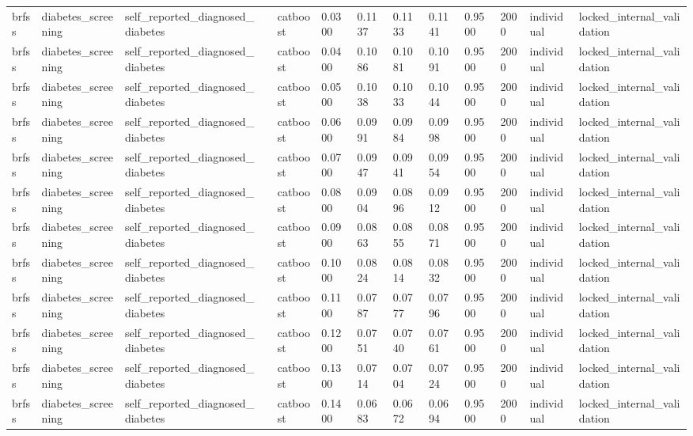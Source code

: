 \begin{tabular}{lllllllllllll}
brfss & diabetes\_screening & self\_reported\_diagnosed\_diabetes &  & catboost & 0.0300 & 0.1137 & 0.1133 & 0.1141 & 0.9500 & 2000 & individual & locked\_internal\_validation \\
brfss & diabetes\_screening & self\_reported\_diagnosed\_diabetes &  & catboost & 0.0400 & 0.1086 & 0.1081 & 0.1091 & 0.9500 & 2000 & individual & locked\_internal\_validation \\
brfss & diabetes\_screening & self\_reported\_diagnosed\_diabetes &  & catboost & 0.0500 & 0.1038 & 0.1033 & 0.1044 & 0.9500 & 2000 & individual & locked\_internal\_validation \\
brfss & diabetes\_screening & self\_reported\_diagnosed\_diabetes &  & catboost & 0.0600 & 0.0991 & 0.0984 & 0.0998 & 0.9500 & 2000 & individual & locked\_internal\_validation \\
brfss & diabetes\_screening & self\_reported\_diagnosed\_diabetes &  & catboost & 0.0700 & 0.0947 & 0.0941 & 0.0954 & 0.9500 & 2000 & individual & locked\_internal\_validation \\
brfss & diabetes\_screening & self\_reported\_diagnosed\_diabetes &  & catboost & 0.0800 & 0.0904 & 0.0896 & 0.0912 & 0.9500 & 2000 & individual & locked\_internal\_validation \\
brfss & diabetes\_screening & self\_reported\_diagnosed\_diabetes &  & catboost & 0.0900 & 0.0863 & 0.0855 & 0.0871 & 0.9500 & 2000 & individual & locked\_internal\_validation \\
brfss & diabetes\_screening & self\_reported\_diagnosed\_diabetes &  & catboost & 0.1000 & 0.0824 & 0.0814 & 0.0832 & 0.9500 & 2000 & individual & locked\_internal\_validation \\
brfss & diabetes\_screening & self\_reported\_diagnosed\_diabetes &  & catboost & 0.1100 & 0.0787 & 0.0777 & 0.0796 & 0.9500 & 2000 & individual & locked\_internal\_validation \\
brfss & diabetes\_screening & self\_reported\_diagnosed\_diabetes &  & catboost & 0.1200 & 0.0751 & 0.0740 & 0.0761 & 0.9500 & 2000 & individual & locked\_internal\_validation \\
brfss & diabetes\_screening & self\_reported\_diagnosed\_diabetes &  & catboost & 0.1300 & 0.0714 & 0.0704 & 0.0724 & 0.9500 & 2000 & individual & locked\_internal\_validation \\
brfss & diabetes\_screening & self\_reported\_diagnosed\_diabetes &  & catboost & 0.1400 & 0.0683 & 0.0672 & 0.0694 & 0.9500 & 2000 & individual & locked\_internal\_validation \\

\end{tabular}
